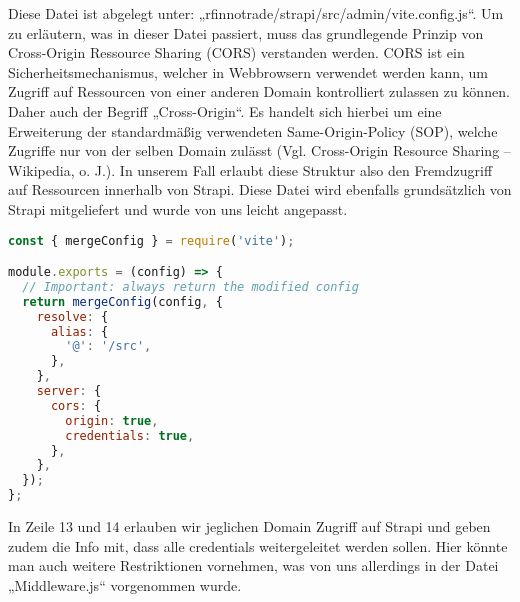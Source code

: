 Diese Datei ist abgelegt unter: „rfinnotrade/strapi/src/admin/vite.config.js“.
Um zu erläutern, was in dieser Datei passiert, muss das grundlegende Prinzip von Cross-Origin Ressource Sharing (CORS) verstanden werden. CORS ist ein Sicherheitsmechanismus, welcher in Webbrowsern verwendet werden kann, um Zugriff auf Ressourcen von einer anderen Domain kontrolliert zulassen zu können. Daher auch der Begriff „Cross-Origin“. Es handelt sich hierbei um eine Erweiterung der standardmäßig verwendeten Same-Origin-Policy (SOP), welche Zugriffe nur von der selben Domain zulässt (Vgl. Cross-Origin Resource Sharing – Wikipedia, o. J.). In unserem Fall erlaubt diese Struktur also den Fremdzugriff auf Ressourcen innerhalb von Strapi.
Diese Datei wird ebenfalls grundsätzlich von Strapi mitgeliefert und wurde von uns leicht angepasst.

\begin{lstlisting}[language=JavaScript, caption={Vite.config.js}, label={lst:viteconfigjs}]
const { mergeConfig } = require('vite');

module.exports = (config) => {
  // Important: always return the modified config
  return mergeConfig(config, {
    resolve: {
      alias: {
        '@': '/src',
      },
    },
    server: {
      cors: {
        origin: true,
        credentials: true,
      },
    },
  });
};
\end{lstlisting}

In Zeile 13 und 14 erlauben wir jeglichen Domain Zugriff auf Strapi und geben zudem die Info mit, dass alle credentials weitergeleitet werden sollen. Hier könnte man auch weitere Restriktionen vornehmen, was von uns allerdings in der Datei „Middleware.js“ vorgenommen wurde.